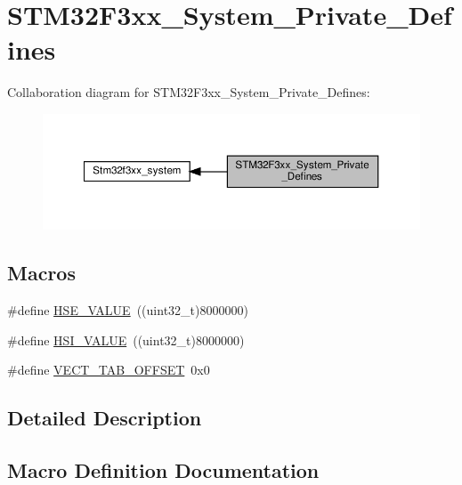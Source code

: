 \hypertarget{group__STM32F3xx__System__Private__Defines}{}\section{S\+T\+M32\+F3xx\+\_\+\+System\+\_\+\+Private\+\_\+\+Defines}
\label{group__STM32F3xx__System__Private__Defines}
Collaboration diagram for S\+T\+M32\+F3xx\+\_\+\+System\+\_\+\+Private\+\_\+\+Defines\+:\nopagebreak
\begin{figure}[H]
\begin{center}
\leavevmode
\includegraphics[width=350pt]{group__STM32F3xx__System__Private__Defines}
\end{center}
\end{figure}
\subsection*{Macros}
\begin{DoxyCompactItemize}
\item 
\#define \hyperlink{group__STM32F3xx__System__Private__Defines_gaeafcff4f57440c60e64812dddd13e7cb}{H\+S\+E\+\_\+\+V\+A\+L\+UE}~((uint32\+\_\+t)8000000)
\item 
\#define \hyperlink{group__STM32F3xx__System__Private__Defines_gaaa8c76e274d0f6dd2cefb5d0b17fbc37}{H\+S\+I\+\_\+\+V\+A\+L\+UE}~((uint32\+\_\+t)8000000)
\item 
\#define \hyperlink{group__STM32F3xx__System__Private__Defines_ga40e1495541cbb4acbe3f1819bd87a9fe}{V\+E\+C\+T\+\_\+\+T\+A\+B\+\_\+\+O\+F\+F\+S\+ET}~0x0
\end{DoxyCompactItemize}


\subsection{Detailed Description}


\subsection{Macro Definition Documentation}
\mbox{\label{group__STM32F3xx__System__Private__Defines_gaeafcff4f57440c60e64812dddd13e7cb}} 
